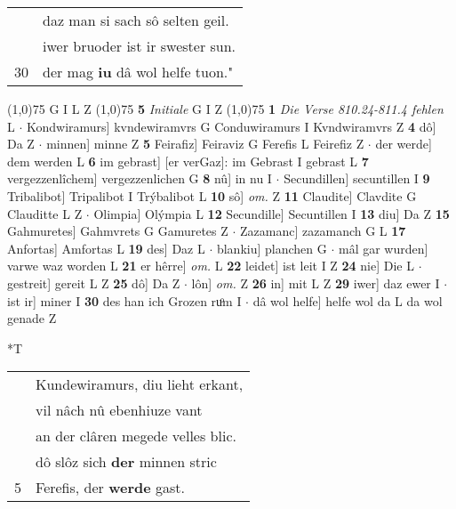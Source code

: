 \documentclass[8pt,a4paper,notitlepage]{article}
\begin{document}
\begin{table}[ht]
\begin{minipage}[t]{0.5\linewidth}
\begin{tabular}{rl}
 & daz man si sach sô selten geil.\\ 
 & iwer bruoder ist ir swester sun.\\ 
30 & der mag \textbf{iu} dâ wol helfe tuon."\\ 
\end{tabular}
\scriptsize
\line(1,0){75} \newline
G I L Z \newline
\line(1,0){75} \newline
\textbf{5} \textit{Initiale} G I Z  \newline
\line(1,0){75} \newline
\textbf{1} \textit{Die Verse 810.24-811.4 fehlen} L   $\cdot$ Kondwiramurs] kvndewiramvrs G Conduwiramurs I Kvndwiramvrs Z \textbf{4} dô] Da Z  $\cdot$ minnen] minne Z \textbf{5} Feirafiz] Feiraviz G Ferefis L Feirefiz Z  $\cdot$ der werde] dem werden L \textbf{6} im gebrast] [er verGaz]: im Gebrast I gebrast L \textbf{7} vergezzenlîchem] vergezzenlichen G \textbf{8} nû] in nu I  $\cdot$ Secundillen] secuntillen I \textbf{9} Tribalibot] Tripalibot I Trýbalibot L \textbf{10} sô] \textit{om.} Z \textbf{11} Claudite] Clavdite G Clauditte L Z  $\cdot$ Olimpia] Olýmpia L \textbf{12} Secundille] Secuntillen I \textbf{13} diu] Da Z \textbf{15} Gahmuretes] Gahmvrets G Gamuretes Z  $\cdot$ Zazamanc] zazamanch G L \textbf{17} Anfortas] Amfortas L \textbf{19} des] Daz L  $\cdot$ blankiu] planchen G  $\cdot$ mâl gar wurden] varwe waz worden L \textbf{21} er hêrre] \textit{om.} L \textbf{22} leidet] ist leit I Z \textbf{24} nie] Die L  $\cdot$ gestreit] gereit L Z \textbf{25} dô] Da Z  $\cdot$ lôn] \textit{om.} Z \textbf{26} in] mit L Z \textbf{29} iwer] daz ewer I  $\cdot$ ist ir] miner I \textbf{30} des han ich Grozen ruͦm I  $\cdot$ dâ wol helfe] helfe wol da L da wol genade Z \newline
\end{minipage}
\hspace{0.5cm}
\begin{minipage}[t]{0.5\linewidth}
\small
\begin{center}*T
\end{center}
\begin{tabular}{rl}
 & Kundewiramurs, diu lieht erkant,\\ 
 & vil nâch nû ebenhiuze vant\\ 
 & an der clâren megede velles blic.\\ 
 & dô slôz sich \textbf{der} minnen stric\\ 
5 & Ferefis, der \textbf{werde} gast.\\ 

\end{tabular}
\end{minipage}
\end{table}
\end{document}
